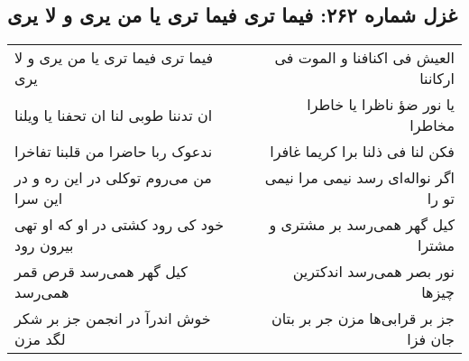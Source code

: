 \begin{center}
\section*{غزل شماره ۲۶۲: فیما تری فیما تری یا من یری و لا یری}
\label{sec:0262}
\begin{longtable}{l p{0.5cm} r}
فیما تری فیما تری یا من یری و لا یری
&&
العیش فی اکنافنا و الموت فی ارکاننا
\\
ان تدننا طوبی لنا ان تحفنا یا ویلنا
&&
یا نور ضؤ ناظرا یا خاطرا مخاطرا
\\
ندعوک ربا حاضرا من قلبنا تفاخرا
&&
فکن لنا فی ذلنا برا کریما غافرا
\\
من می‌روم توکلی در این ره و در این سرا
&&
اگر نواله‌ای رسد نیمی مرا نیمی تو را
\\
خود کی رود کشتی در او که او تهی بیرون رود
&&
کیل گهر همی‌رسد بر مشتری و مشترا
\\
کیل گهر همی‌رسد قرص قمر همی‌رسد
&&
نور بصر همی‌رسد اندکترین چیزها
\\
خوش اندرآ در انجمن جز بر شکر لگد مزن
&&
جز بر قرابی‌ها مزن جر بر بتان جان فزا
\\
\end{longtable}
\end{center}
